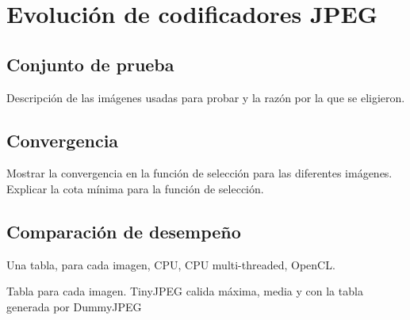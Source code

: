 
\chapter{Evolución de codificadores JPEG}\label{ch:resultados_evolucion}

\section{Conjunto de prueba}

Descripción de las imágenes usadas para probar y la razón por la que se eligieron.

\section{Convergencia}

Mostrar la convergencia en la función de selección para las diferentes imágenes.
Explicar la cota mínima para la función de selección.

\section{Comparación de desempeño}

Una tabla, para cada imagen, CPU, CPU multi-threaded, OpenCL.

Tabla para cada imagen. TinyJPEG calida máxima, media y con la tabla generada por DummyJPEG

